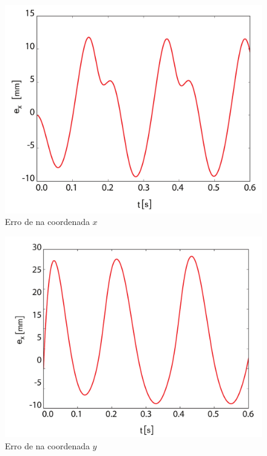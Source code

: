 \documentclass[]{politex}
\begin{document}
\begin{multicols}{2}
\begin{figure}[H]
	\centering
	\includegraphics[scale=0.31]{../figures/ex3.pdf}  
	\caption{Erro de na coordenada $x$}
	\label{fig:ex3}
\end{figure}

\begin{figure}[H]
	\centering
	\includegraphics[scale=0.31]{../figures/ey3.pdf}  
	\caption{Erro de na coordenada $y$}
	\label{fig:ey3}
\end{figure}
\end{multicols}
\end{document}
